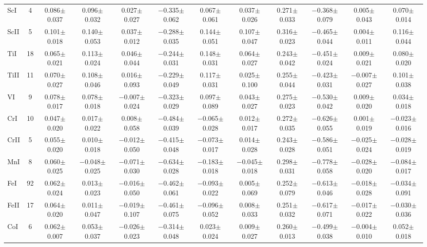 \documentclass[oneside]{emulateapj}
\begin{document}
\begin{table}
\begin{tabular}{lccccccccccc}
ScI & 4 & 0.086$\pm$0.037 & 0.096$\pm$0.032 & 0.027$\pm$0.027 & $-$0.335$\pm$0.062 & 0.067$\pm$0.061 & 0.037$\pm$0.026 & 0.271$\pm$0.033 & $-$0.368$\pm$0.079 & 0.005$\pm$0.043 & 0.070$\pm$0.014 \\
ScII & 5 & 0.101$\pm$0.018 & 0.140$\pm$0.053 & 0.037$\pm$0.012 & $-$0.288$\pm$0.035 & 0.144$\pm$0.051 & 0.107$\pm$0.047 & 0.316$\pm$0.023 & $-$0.465$\pm$0.044 & 0.004$\pm$0.011 & 0.116$\pm$0.044 \\
TiI & 18 & 0.065$\pm$0.021 & 0.113$\pm$0.024 & 0.046$\pm$0.044 & $-$0.244$\pm$0.031 & 0.148$\pm$0.031 & 0.064$\pm$0.027 & 0.243$\pm$0.042 & $-$0.451$\pm$0.024 & 0.009$\pm$0.021 & 0.080$\pm$0.020 \\
TiII & 11 & 0.070$\pm$0.027 & 0.108$\pm$0.046 & 0.016$\pm$0.093 & $-$0.229$\pm$0.049 & 0.117$\pm$0.031 & 0.025$\pm$0.100 & 0.255$\pm$0.044 & $-$0.423$\pm$0.031 & $-$0.007$\pm$0.027 & 0.101$\pm$0.038 \\
VI & 9 & 0.078$\pm$0.017 & 0.078$\pm$0.018 & $-$0.007$\pm$0.024 & $-$0.323$\pm$0.029 & 0.097$\pm$0.089 & 0.043$\pm$0.027 & 0.275$\pm$0.023 & $-$0.530$\pm$0.042 & 0.009$\pm$0.020 & 0.034$\pm$0.018 \\
CrI & 10 & 0.047$\pm$0.020 & 0.017$\pm$0.022 & 0.008$\pm$0.058 & $-$0.484$\pm$0.039 & $-$0.065$\pm$0.028 & 0.012$\pm$0.017 & 0.272$\pm$0.035 & $-$0.626$\pm$0.055 & 0.001$\pm$0.019 & $-$0.023$\pm$0.016 \\
CrII & 5 & 0.055$\pm$0.020 & 0.010$\pm$0.018 & $-$0.012$\pm$0.050 & $-$0.415$\pm$0.048 & $-$0.073$\pm$0.017 & 0.014$\pm$0.028 & 0.243$\pm$0.028 & $-$0.586$\pm$0.051 & $-$0.025$\pm$0.024 & $-$0.028$\pm$0.019 \\
MnI & 8 & 0.060$\pm$0.025 & $-$0.048$\pm$0.025 & $-$0.071$\pm$0.030 & $-$0.634$\pm$0.028 & $-$0.183$\pm$0.018 & $-$0.045$\pm$0.018 & 0.298$\pm$0.031 & $-$0.778$\pm$0.058 & $-$0.028$\pm$0.020 & $-$0.084$\pm$0.017 \\
FeI & 92 & 0.062$\pm$0.024 & 0.013$\pm$0.023 & $-$0.016$\pm$0.050 & $-$0.462$\pm$0.061 & $-$0.093$\pm$0.022 & 0.005$\pm$0.069 & 0.252$\pm$0.079 & $-$0.613$\pm$0.046 & $-$0.018$\pm$0.028 & $-$0.034$\pm$0.091 \\
FeII & 17 & 0.064$\pm$0.020 & 0.011$\pm$0.047 & $-$0.019$\pm$0.107 & $-$0.461$\pm$0.075 & $-$0.096$\pm$0.052 & 0.008$\pm$0.033 & 0.251$\pm$0.032 & $-$0.617$\pm$0.071 & $-$0.017$\pm$0.022 & $-$0.030$\pm$0.036 \\
CoI & 6 & 0.062$\pm$0.007 & 0.053$\pm$0.037 & $-$0.026$\pm$0.023 & $-$0.314$\pm$0.048 & 0.023$\pm$0.024 & 0.009$\pm$0.027 & 0.260$\pm$0.013 & $-$0.499$\pm$0.038 & $-$0.004$\pm$0.010 & 0.052$\pm$0.018 \\

\end{tabular}
\end{table}
\end{document}
